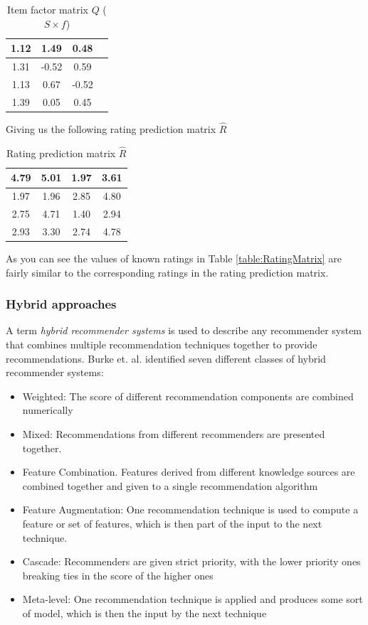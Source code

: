 \begin{table}[!htbp]
\centering
\begin{tabular}{|c|c|c|c|}
\hline
1.12	&	1.49	&	0.48\\ \hline
1.31	&-0.52	&0.59\\ \hline
1.13	&0.67&	-0.52\\ \hline
1.39	&0.05&	0.45\\ \hline
\end{tabular}
\label{table:UserFeature}
\caption{Item factor matrix $Q$ ($S \times f$)}
\end{table} 

Giving us the following rating prediction matrix $\hat{R}$

\begin{table}[!htbp]
\centering
\begin{tabular}{|c|c|c|c|}
\hline
4.79	&5.01	&1.97	&3.61 \\ \hline
1.97	&1.96	&2.85	&4.80 \\ \hline
2.75	&4.71	&1.40	&2.94 \\ \hline
2.93	&3.30	&2.74	&4.78 \\ \hline
\end{tabular}
\label{table:PredictionMatrix}
\caption{Rating prediction matrix $\hat{R}$}
\end{table} 

As you can see the values of known ratings in Table \ref{table:RatingMatrix} are fairly similar to the corresponding ratings in the rating prediction matrix.

\subsubsection{Hybrid approaches}

A term \emph{hybrid recommender systems} is used to describe any recommender system that combines multiple recommendation techniques together to provide recommendations. Burke et. al. \cite{Burke2002} identified seven different classes of hybrid recommender systems:

\begin{itemize}
\item Weighted: The score of different recommendation components are combined numerically
\item Mixed: Recommendations from different recommenders are presented together.
\item Feature Combination. Features derived from different knowledge sources are combined together and given to a single recommendation algorithm
\item Feature Augmentation: One recommendation technique is used to compute a feature or set of features, which is then part of the input to the next technique.
\item Cascade: Recommenders are given strict priority, with the lower priority ones breaking ties in the score of the higher ones
\item Meta-level: One recommendation technique is applied and produces some sort of model, which is then the input by the next technique
\end{itemize}

